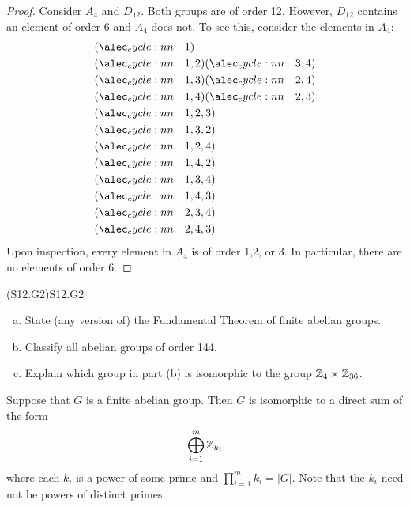\documentclass[../../AlgebraQualSolutions.tex]{subfiles}
\begin{document}
\begin{proof}
	Consider $A_4$ and $D_{12}$. Both groups are of order 12. However, $D_{12}$ contains an element of order 6 and $A_4$ does not. To see this, consider the elements in $A_4$:
		\begin{align*}
			&\perm{1}\\
			&\perm{1,2}\perm{3,4}\\
			&\perm{1,3}\perm{2,4}\\
			&\perm{1,4}\perm{2,3}\\
			&\perm{1,2,3}\\
			&\perm{1,3,2}\\
			&\perm{1,2,4}\\
			&\perm{1,4,2}\\
			&\perm{1,3,4}\\
			&\perm{1,4,3}\\
			&\perm{2,3,4}\\
			&\perm{2,4,3}
		\end{align*}
	Upon inspection, every element in $A_4$ is of order 1,2, or 3. In particular, there are no elements of order 6.
\end{proof}

\begin{prob}{(S12.G2)}{S12.G2}
	\begin{enumerate}[(a)]
		\item State (any version of) the Fundamental Theorem of finite abelian groups.
		\item Classify all abelian groups of order 144.
		\item Explain which group in part (b) is isomorphic to the group $\mathbb{Z}_4 \times \mathbb{Z}_{36}$.
	\end{enumerate}
\end{prob}

Suppose that $G$ is a finite abelian group. Then $G$ is isomorphic to a direct sum of the form
	\[\bigoplus_{i=1}^m \mathbb{Z}_{k_i}\]
where each $k_i$ is a power of some prime and $\prod_{i=1}^m k_i = |G|$. Note that the $k_i$ need not be powers of distinct primes.
\end{document}
